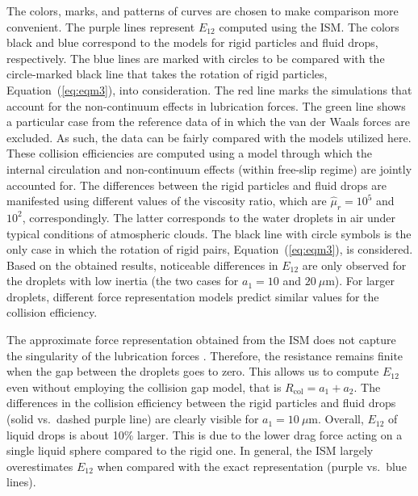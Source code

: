 \documentclass[../thesis.tex]{subfiles}
\begin{document}
The colors, marks, and patterns of curves are chosen to make comparison more convenient. The purple lines represent $E_{12}$ computed using the ISM. The colors black and blue correspond to the models for rigid particles and fluid drops, respectively. The blue lines are marked with circles to be compared with the circle-marked black line that takes the rotation of rigid particles, Equation~(\ref{eq:eqm3}), into consideration. The red line marks the simulations that account for the non-continuum effects in lubrication forces. The green line shows a particular case from the reference data of \cite{RSD22} in which the van der Waals forces are excluded. As such, the data can be fairly compared with the models utilized here. These collision efficiencies \citep{RSD22} are computed using a model through which the internal circulation and non-continuum effects (within free-slip regime) are jointly accounted for. The differences between the rigid particles and fluid drops are manifested using different values of the viscosity ratio, which are $\hat{\mu}_r=10^5$ and $10^2$, correspondingly. The latter corresponds to the water droplets in air under typical conditions of atmospheric clouds. The black line with circle symbols is the only case in which the rotation of rigid pairs, Equation~(\ref{eq:eqm3}), is considered. Based on the obtained results, noticeable differences in $E_{12}$ are only observed for the droplets with low inertia (the two cases for $a_1=10$ and $20~\mu$m). For larger droplets, different force representation models predict similar values for the collision efficiency. 

The approximate force representation obtained from the ISM does not capture the singularity of the lubrication forces \cite[Figure~7(a) in][]{WAG05}. Therefore, the resistance remains finite when the gap between the droplets goes to zero. This allows us to compute $E_{12}$ even without employing the collision gap model, that is $R_\text{col}=a_1+a_2$. The differences in the collision efficiency between the rigid particles and fluid drops (solid vs.\ dashed purple line) are clearly visible for $a_1=10~\mu$m. Overall, $E_{12}$ of liquid drops is about 10\% larger. This is due to the lower drag force acting on a single liquid sphere compared to the rigid one. In general, the ISM largely overestimates $E_{12}$ when compared with the exact representation (purple vs.\ blue lines).
\end{document}
